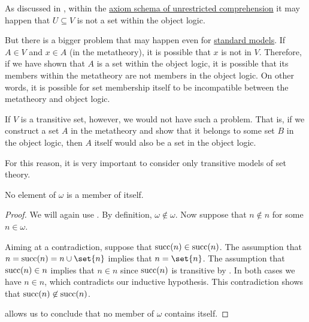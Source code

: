 \begin{remark}\label{rem:transitive_model_of_set_theory}
  As discussed in , within the \hyperref[def:naive_set_theory/unrestricted_comprehension]{axiom schema of unrestricted comprehension} it may happen that \( U \subseteq V \) is not a set within the object logic.

  But there is a bigger problem that may happen even for \hyperref[rem:standard_model_of_set_theory]{standard models}. If \( A \in V \) and \( x \in A \) (in the metatheory), it is possible that \( x \) is not in \( V \). Therefore, if we have shown that \( A \) is a set within the object logic, it is possible that its members within the metatheory are not members in the object logic. On other words, it is possible for set membership itself to be incompatible between the metatheory and object logic.

  If \( V \) is a transitive set, however, we would not have such a problem. That is, if we construct a set \( A \) in the metatheory and show that it belongs to some set \( B \) in the object logic, then \( A \) itself would also be a set in the object logic.

  For this reason, it is very important to consider only transitive models of set theory.
\end{remark}

\begin{lemma}\label{thm:members_of_omega_do_not_contain_themselves}
  No element of \( \omega \) is a member of itself.
\end{lemma}
\begin{proof}
  We will again use . By definition, \( \omega \not\in \omega \). Now suppose that \( n \not\in n \) for some \( n \in \omega \).

  Aiming at a contradiction, suppose that \( \operatorname{succ}(n) \in \operatorname{succ}(n) \). The assumption that \( n = \op{succ}(n) = n \cup \set{ n } \) implies that \( n = \set{ n } \). The assumption that \( \operatorname{succ}(n) \in n \) implies that \( n \in n \) since \( \operatorname{succ}(n) \) is transitive by . In both cases we have \( n \in n \), which contradicts our inductive hypothesis. This contradiction shows that \( \operatorname{succ}(n) \not\in \operatorname{succ}(n) \).

   allows us to conclude that no member of \( \omega \) contains itself.
\end{proof}

